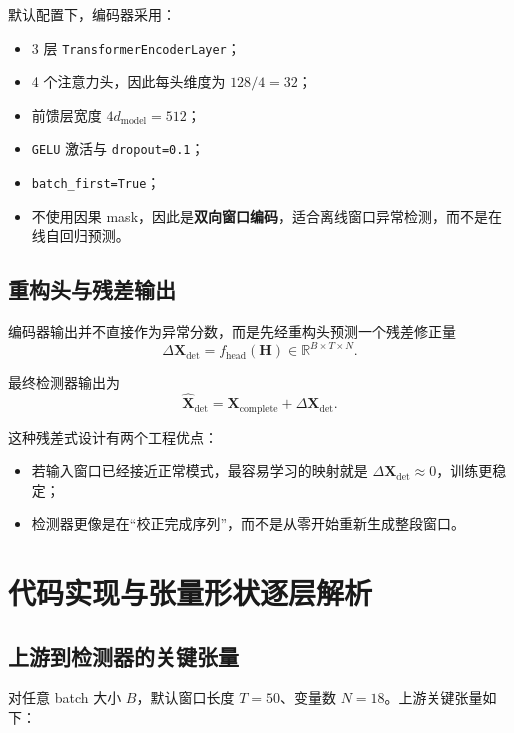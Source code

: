 \documentclass[UTF8]{ctexart}
\begin{document}
默认配置下，编码器采用：
\begin{itemize}
    \item 3 层 \texttt{TransformerEncoderLayer}；
    \item 4 个注意力头，因此每头维度为 \(128/4=32\)；
    \item 前馈层宽度 \(4d_{\text{model}}=512\)；
    \item \texttt{GELU} 激活与 \texttt{dropout=0.1}；
    \item \texttt{batch\_first=True}；
    \item 不使用因果 mask，因此是\textbf{双向窗口编码}，适合离线窗口异常检测，而不是在线自回归预测。
\end{itemize}

\subsection{重构头与残差输出}

编码器输出并不直接作为异常分数，而是先经重构头预测一个残差修正量
\begin{equation}
    \Delta \bm{X}_{\text{det}}
    =
    f_{\text{head}}(\bm{H})
    \in \mathbb{R}^{B \times T \times N}.
\end{equation}

最终检测器输出为
\begin{equation}
    \widehat{\bm{X}}_{\text{det}}
    =
    \bm{X}_{\text{complete}} + \Delta \bm{X}_{\text{det}}.
\end{equation}

这种残差式设计有两个工程优点：
\begin{itemize}
    \item 若输入窗口已经接近正常模式，最容易学习的映射就是 \(\Delta \bm{X}_{\text{det}} \approx 0\)，训练更稳定；
    \item 检测器更像是在“校正完成序列”，而不是从零开始重新生成整段窗口。
\end{itemize}

\section{代码实现与张量形状逐层解析}

\subsection{上游到检测器的关键张量}

对任意 batch 大小 \(B\)，默认窗口长度 \(T=50\)、变量数 \(N=18\)。上游关键张量如下：
\end{document}
